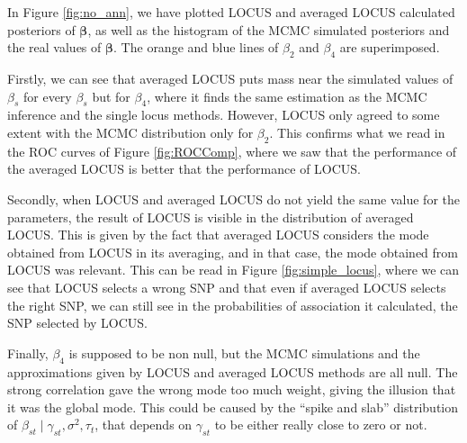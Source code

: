 \documentclass[a4paper, 11pt]{report}
\numberwithin{equation}{chapter}
\begin{document}
In Figure \ref{fig:no_ann}, we have plotted LOCUS and averaged LOCUS calculated posteriors of $\boldsymbol{\beta}$, as well as the histogram of the MCMC simulated posteriors and the real values of $\boldsymbol{\beta}$. The orange and blue lines of $\beta_2$ and $\beta_4$ are superimposed.

Firstly, we can see that averaged LOCUS puts mass near the simulated values of $\beta_s$ for every $\beta_s$ but for $\beta_4$, where it finds the same estimation as the MCMC inference and the single locus methods. However, LOCUS only agreed to some extent with the MCMC distribution only for $\beta_2$. This confirms what we read in the ROC curves of Figure \ref{fig:ROCComp}, where we saw that the performance of the averaged LOCUS is better that the performance of LOCUS.

Secondly, when LOCUS and averaged LOCUS do not yield the same value for the parameters, the result of LOCUS is visible in the distribution of averaged LOCUS. This is given by the fact that averaged LOCUS considers the mode obtained from LOCUS in its averaging, and in that case, the mode obtained from LOCUS was relevant. This can be read in Figure \ref{fig:simple_locus}, where we can see that LOCUS selects a wrong SNP and that even if averaged LOCUS selects the right SNP, we can still see in the probabilities of association it calculated, the SNP selected by LOCUS.

Finally, $\beta_4$ is supposed to be non null, but the MCMC simulations and the approximations given by LOCUS and averaged LOCUS methods are all null. The strong correlation gave the wrong mode too much weight, giving the illusion that it was the global mode. This could be caused by the ``spike and slab'' distribution of $\beta_{st}\mid \gamma_{st}, \sigma^2, \tau_t$, that depends on $\gamma_{st}$ to be either really close to zero or not.
\end{document}
